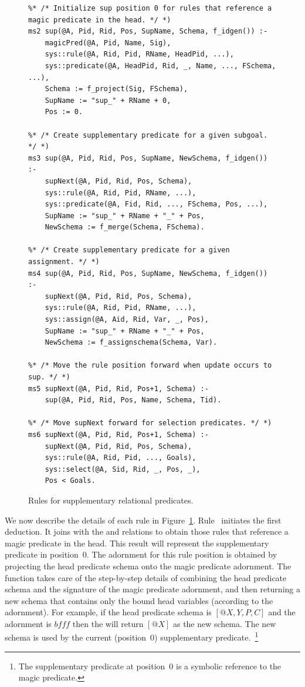 \begin{figure}
\ssp
\centering
\begin{lstlisting}
%* /* Initialize sup position 0 for rules that reference a magic predicate in the head. */ *)
ms2 sup(@A, Pid, Rid, Pos, SupName, Schema, f_idgen()) :-
    magicPred(@A, Pid, Name, Sig),
    sys::rule(@A, Rid, Pid, RName, HeadPid, ...),
    sys::predicate(@A, HeadPid, Rid, _, Name, ..., FSchema, ...),
    Schema := f_project(Sig, FSchema),
    SupName := "sup_" + RName + 0,
    Pos := 0.

%* /* Create supplementary predicate for a given subgoal. */ *)
ms3 sup(@A, Pid, Rid, Pos, SupName, NewSchema, f_idgen()) :-
    supNext(@A, Pid, Rid, Pos, Schema),
    sys::rule(@A, Rid, Pid, RName, ...),
    sys::predicate(@A, Fid, Rid, ..., FSchema, Pos, ...),
    SupName := "sup_" + RName + "_" + Pos,
    NewSchema := f_merge(Schema, FSchema).
	
%* /* Create supplementary predicate for a given assignment. */ *)
ms4 sup(@A, Pid, Rid, Pos, SupName, NewSchema, f_idgen()) :-
    supNext(@A, Pid, Rid, Pos, Schema), 
    sys::rule(@A, Rid, Pid, RName, ...),
    sys::assign(@A, Aid, Rid, Var, _, Pos),
    SupName := "sup_" + RName + "_" + Pos,
    NewSchema := f_assignschema(Schema, Var).

%* /* Move the rule position forward when update occurs to sup. */ *)
ms5 supNext(@A, Pid, Rid, Pos+1, Schema) :-
    sup(@A, Pid, Rid, Pos, Name, Schema, Tid).
	
%* /* Move supNext forward for selection predicates. */ *)
ms6 supNext(@A, Pid, Rid, Pos+1, Schema) :-
    supNext(@A, Pid, Rid, Pos, Schema),
    sys::rule(@A, Rid, Pid, ..., Goals),
    sys::select(@A, Sid, Rid, _, Pos, _),
    Pos < Goals. 
\end{lstlisting}
\caption{\label{ch:magic:fig:magic2}Rules for supplementary relational predicates.}
\end{figure}

We now describe the details of each rule in Figure~\ref{ch:magic:fig:magic2}.
Rule~ initiates the first  deduction.  It joins 
with the  and  relations to obtain those rules that
reference a magic predicate in the head.  This result will represent the
supplementary predicate in position~$0$.  The adornment for this rule position
is obtained by projecting the head predicate schema onto the magic predicate
adornment.  The function  takes care of the step-by-step
details of combining the head predicate schema and the signature of the magic
predicate adornment, and then returning a new schema that contains only the bound
head variables (according to the adornment).  For example, if the head
predicate schema is $[@X, Y, P, C]$ and the adornment is $bfff$ then the  
will return $[@X]$ as the new schema.  The new schema is used by
the current (position~$0$) supplementary predicate.~\footnote{The supplementary
predicate at position~$0$ is a symbolic reference to the magic predicate.}


